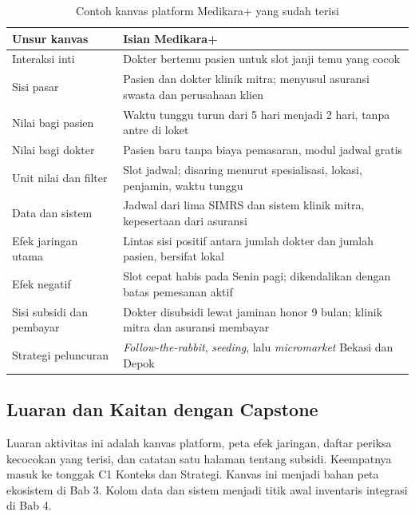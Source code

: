 \begin{table}[!htb]
  \centering
  \caption{Contoh kanvas platform Medikara+ yang sudah terisi}
  \label{tab:ch02-kanvas-contoh}
  \small
  \begin{tabularx}{\textwidth}{lX}
    \hline
    \textbf{Unsur kanvas} & \textbf{Isian Medikara+} \\
    \hline
    Interaksi inti & Dokter bertemu pasien untuk slot janji temu yang cocok \\
    \hline
    Sisi pasar & Pasien dan dokter klinik mitra; menyusul asuransi swasta dan perusahaan klien \\
    \hline
    Nilai bagi pasien & Waktu tunggu turun dari 5 hari menjadi 2 hari, tanpa antre di loket \\
    \hline
    Nilai bagi dokter & Pasien baru tanpa biaya pemasaran, modul jadwal gratis \\
    \hline
    Unit nilai dan filter & Slot jadwal; disaring menurut spesialisasi, lokasi, penjamin, waktu tunggu \\
    \hline
    Data dan sistem & Jadwal dari lima SIMRS dan sistem klinik mitra, kepesertaan dari asuransi \\
    \hline
    Efek jaringan utama & Lintas sisi positif antara jumlah dokter dan jumlah pasien, bersifat lokal \\
    \hline
    Efek negatif & Slot cepat habis pada Senin pagi; dikendalikan dengan batas pemesanan aktif \\
    \hline
    Sisi subsidi dan pembayar & Dokter disubsidi lewat jaminan honor 9 bulan; klinik mitra dan asuransi membayar \\
    \hline
    Strategi peluncuran & \textit{Follow-the-rabbit}, \textit{seeding}, lalu \textit{micromarket} Bekasi dan Depok \\
    \hline
  \end{tabularx}
\end{table}

\subsection*{Luaran dan Kaitan dengan Capstone}

Luaran aktivitas ini adalah kanvas platform, peta efek jaringan, daftar periksa
kecocokan yang terisi, dan catatan satu halaman tentang subsidi. Keempatnya
masuk ke tonggak C1 Konteks dan Strategi. Kanvas ini menjadi bahan peta
ekosistem di Bab 3. Kolom data dan sistem menjadi titik awal inventaris
integrasi di Bab 4.

